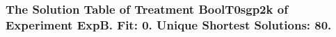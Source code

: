  \begin{frame}
 \fontsize{8pt}{9pt}\selectfont
 \frametitle{ The Solution Table of Treatment BoolT0sgp2k of Experiment ExpB. Fit: 0. Unique Shortest Solutions: 80. }

 \label{ExpBSolutionTable000.tex}  
 \end{frame}

